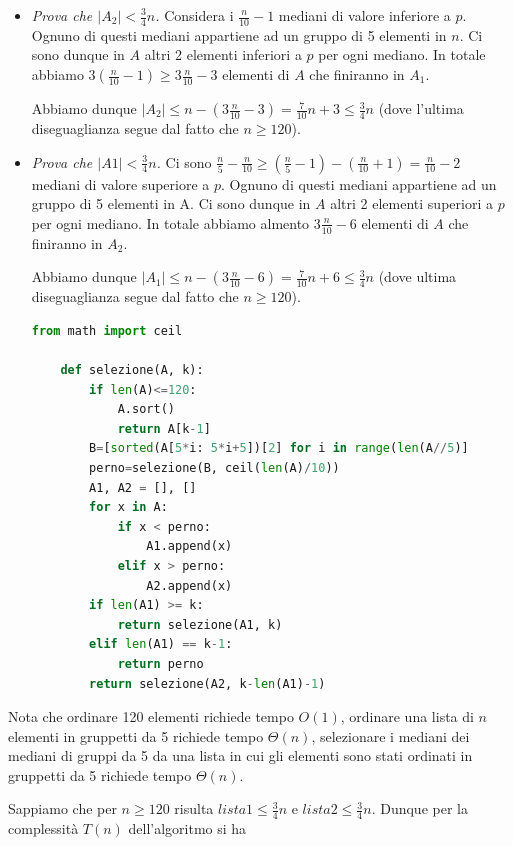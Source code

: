 \begin{itemize}
    \item \textit{Prova che $|A_2|<\frac{3}{4}n$.} Considera i $\frac{n}{10}-1$ mediani di valore inferiore a $p$. Ognuno di questi mediani appartiene ad un gruppo di 5 elementi in $n$. Ci sono dunque in $A$ altri 2 elementi inferiori a $p$ per ogni mediano. In totale abbiamo $3\left(\frac{n}{10}-1\right)\geq3\frac{n}{10}-3$ elementi di $A$ che finiranno in $A_1$.

    Abbiamo dunque $|A_2|\leq n-\left(3\frac{n}{10}-3\right)=\frac{7}{10}n+3\leq \frac{3}{4}n$ (dove l'ultima diseguaglianza segue dal fatto che $n\geq 120$).
    \item \textit{Prova che $|A1|<\frac{3}{4}n$.} Ci sono $\frac{n}{5}-\frac{n}{10}\geq\left(\frac{n}{5}-1\right)-\left(\frac{n}{10}+1\right)=\frac{n}{10}-2$ mediani di valore superiore a $p$. Ognuno di questi mediani appartiene ad un gruppo di 5 elementi in A. Ci sono dunque in $A$ altri 2 elementi superiori a $p$ per ogni mediano. In totale abbiamo almento $3\frac{n}{10}-6$ elementi di $A$ che finiranno in $A_2$.

    Abbiamo dunque $|A_1|\leq n-\left(3\frac{n}{10}-6\right)=\frac{7}{10}n+6\leq \frac{3}{4}n$ (dove ultima diseguaglianza segue dal fatto che $n\geq 120$).

    \begin{lstlisting}[language=Python]
    from math import ceil

    def selezione(A, k):
        if len(A)<=120:
            A.sort()
            return A[k-1]
        B=[sorted(A[5*i: 5*i+5])[2] for i in range(len(A//5)]
        perno=selezione(B, ceil(len(A)/10))
        A1, A2 = [], []
        for x in A:
            if x < perno: 
                A1.append(x)
            elif x > perno: 
                A2.append(x)
        if len(A1) >= k:
            return selezione(A1, k)
        elif len(A1) == k-1:
            return perno
        return selezione(A2, k-len(A1)-1)
    \end{lstlisting}

\end{itemize}

Nota che ordinare 120 elementi richiede tempo $O(1)$, ordinare una lista di $n$ elementi in gruppetti da 5 richiede tempo $\Theta(n)$, selezionare i mediani dei mediani di gruppi da 5 da una lista in cui gli elementi sono stati ordinati in gruppetti da 5 richiede tempo $\Theta(n)$.

Sappiamo che per $n\geq 120$ risulta $lista1\leq\frac{3}{4}n$ e $lista2\leq\frac{3}{4}n$. Dunque per la complessità $T(n)$ dell'algoritmo si ha

